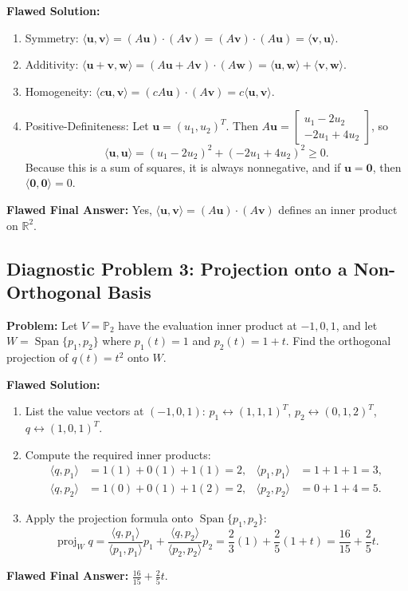 \documentclass[11pt, letterpaper]{article}
\theoremstyle{definition}
\theoremstyle{remark}
\begin{document}
\textbf{Flawed Solution:}
\begin{enumerate}
    \item Symmetry: $\langle \mathbf{u}, \mathbf{v} \rangle = (A\mathbf{u})\cdot(A\mathbf{v}) = (A\mathbf{v})\cdot(A\mathbf{u}) = \langle \mathbf{v}, \mathbf{u} \rangle$.
    \item Additivity: $\langle \mathbf{u} + \mathbf{v}, \mathbf{w} \rangle = (A\mathbf{u} + A\mathbf{v})\cdot(A\mathbf{w}) = \langle \mathbf{u}, \mathbf{w} \rangle + \langle \mathbf{v}, \mathbf{w} \rangle$.
    \item Homogeneity: $\langle c\mathbf{u}, \mathbf{v} \rangle = (cA\mathbf{u})\cdot(A\mathbf{v}) = c\langle \mathbf{u}, \mathbf{v} \rangle$.
    \item Positive-Definiteness: Let $\mathbf{u} = (u_1, u_2)^T$. Then $A\mathbf{u} = \begin{bmatrix} u_1 - 2u_2 \\ -2u_1 + 4u_2 \end{bmatrix}$, so
    \[
        \langle \mathbf{u}, \mathbf{u} \rangle = (u_1 - 2u_2)^2 + (-2u_1 + 4u_2)^2 \ge 0.
    \]
    Because this is a sum of squares, it is always nonnegative, and if $\mathbf{u} = \mathbf{0}$, then $\langle \mathbf{0}, \mathbf{0} \rangle = 0$.
\end{enumerate}
\textbf{Flawed Final Answer:} Yes, $\langle \mathbf{u}, \mathbf{v} \rangle = (A\mathbf{u}) \cdot (A\mathbf{v})$ defines an inner product on $\mathbb{R}^2$.

\subsection{Diagnostic Problem 3: Projection onto a Non-Orthogonal Basis}

\textbf{Problem:} Let $V = \mathbb{P}_2$ have the evaluation inner product at $-1, 0, 1$, and let $W = \operatorname{Span}\{p_1, p_2\}$ where $p_1(t) = 1$ and $p_2(t) = 1 + t$. Find the orthogonal projection of $q(t) = t^2$ onto $W$.

\textbf{Flawed Solution:}
\begin{enumerate}
    \item List the value vectors at $(-1, 0, 1)$: $p_1 \leftrightarrow (1, 1, 1)^T$, $p_2 \leftrightarrow (0, 1, 2)^T$, $q \leftrightarrow (1, 0, 1)^T$.
    \item Compute the required inner products:
    \begin{align*}
        \langle q, p_1 \rangle &= 1(1) + 0(1) + 1(1) = 2, & \langle p_1, p_1 \rangle &= 1 + 1 + 1 = 3, \\
        \langle q, p_2 \rangle &= 1(0) + 0(1) + 1(2) = 2, & \langle p_2, p_2 \rangle &= 0 + 1 + 4 = 5.
    \end{align*}
    \item Apply the projection formula onto $\operatorname{Span}\{p_1, p_2\}$:
    \[
        \operatorname{proj}_W q = \frac{\langle q, p_1 \rangle}{\langle p_1, p_1 \rangle}p_1 + \frac{\langle q, p_2 \rangle}{\langle p_2, p_2 \rangle}p_2 = \frac{2}{3}(1) + \frac{2}{5}(1 + t) = \frac{16}{15} + \frac{2}{5}t.
    \]
\end{enumerate}
\textbf{Flawed Final Answer:} $\displaystyle \frac{16}{15} + \frac{2}{5}t$.
\end{document}
